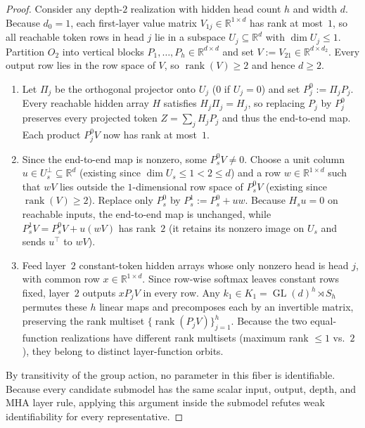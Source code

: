 \documentclass[11pt]{article}
\theoremstyle{plain}
\theoremstyle{definition}
\theoremstyle{remark}
\DeclareMathOperator{\GL}{GL}
\DeclareMathOperator{\rank}{rank}
\begin{document}
\begin{proof}
Consider any depth-$2$ realization with hidden head count $h$ and width $d$. Because $d_0 = 1$, each first-layer value matrix $V_{1j} \in \mathbb{R}^{1 \times d}$ has rank at most~$1$, so all reachable token rows in head $j$ lie in a subspace $U_j \subseteq \mathbb{R}^d$ with $\dim U_j \le 1$. Partition $O_2$ into vertical blocks $P_1, \dots, P_h \in \mathbb{R}^{d \times d}$ and set $V := V_{21} \in \mathbb{R}^{d \times d_2}$. Every output row lies in the row space of $V$, so $\rank(V) \ge 2$ and hence $d \ge 2$.
\begin{enumerate}[leftmargin=2em,label=\textup{(\arabic*)}]
\item Let $\Pi_j$ be the orthogonal projector onto $U_j$ ($0$ if $U_j = 0$) and set $P_j^0 := \Pi_j P_j$. Every reachable hidden array $H$ satisfies $H_j \Pi_j = H_j$, so replacing $P_j$ by $P_j^0$ preserves every projected token $Z = \sum_j H_j P_j$ and thus the end-to-end map. Each product $P_j^0 V$ now has rank at most~$1$.
\item Since the end-to-end map is nonzero, some $P_s^0 V \neq 0$. Choose a unit column $u \in U_s^\perp \subseteq \mathbb{R}^d$ (existing since $\dim U_s \le 1 < 2 \le d$) and a row $w \in \mathbb{R}^{1 \times d}$ such that $wV$ lies outside the $1$-dimensional row space of $P_s^0 V$ (existing since $\rank(V) \ge 2$). Replace only $P_s^0$ by $P_s^1 := P_s^0 + u w$. Because $H_s u = 0$ on reachable inputs, the end-to-end map is unchanged, while $P_s^1 V = P_s^0 V + u(wV)$ has rank~$2$ (it retains its nonzero image on $U_s$ and sends $u^\top$ to $wV$).
\item Feed layer~$2$ constant-token hidden arrays whose only nonzero head is head $j$, with common row $x \in \mathbb{R}^{1 \times d}$. Since row-wise softmax leaves constant rows fixed, layer~$2$ outputs $x P_j V$ in every row. Any $k_1 \in K_1 = \GL(d)^h \rtimes S_h$ permutes these $h$ linear maps and precomposes each by an invertible matrix, preserving the rank multiset $\{\rank(P_j V)\}_{j=1}^h$. Because the two equal-function realizations have different rank multisets (maximum rank $\le 1$ vs.~$2$), they belong to distinct layer-function orbits.
\end{enumerate}
By transitivity of the group action, no parameter in this fiber is identifiable. Because every candidate submodel has the same scalar input, output, depth, and MHA layer rule, applying this argument inside the submodel refutes weak identifiability for every representative.
\end{proof}
\end{document}
